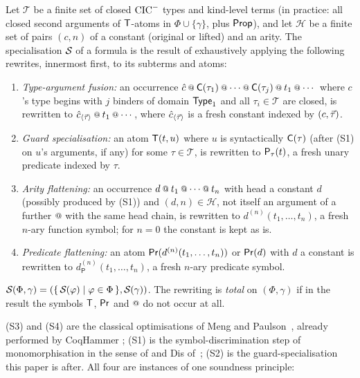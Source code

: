 \begin{definition}
\label{def:spec}
Let $\mathcal{T}$ be a finite set of closed $\mathrm{CIC}^{-}$ types and
kind-level terms (in practice: all closed second arguments of
$\mathsf{T}$-atoms in $\Phi \cup \{\gamma\}$, plus $\mathsf{Prop}$), and let
$\mathcal{H}$ be a finite set of pairs $(c, n)$ of a constant
(original or lifted) and an arity.  The specialisation
$\mathcal{S}_{}$ of a formula is the result of exhaustively applying the
following rewrites, innermost first, to its subterms and atoms:
\begin{enumerate}[label=(S\arabic*),leftmargin=3em]
\item \emph{Type-argument fusion:} an occurrence $\hat{c} \app
  \trCn{\tau_1} \app \cdots \app \trCn{\tau_j} \app t_1 \app \cdots$
  where $c$'s type begins with $j$ binders of domain $\mathsf{Type}_1$ and
  all $\tau_i \in \mathcal{T}$ are closed, is rewritten to
  $\hat{c}_{\langle\tup{\tau}\rangle} \app t_1 \app \cdots$, where
  $\hat{c}_{\langle\vec{\tau}\rangle}$ is a fresh constant indexed
  by $(c, \vec{\tau})$.
\item \emph{Guard specialisation:} an atom $\mathsf{T}(t, u)$ where
  $u$ is syntactically $\mathsf{C}(\tau)$ (after (S1) on $u$'s
  arguments, if any) for some $\tau \in \mathcal{T}$, is rewritten
  to $\mathsf{P}_{\tau}(t)$, a fresh unary predicate indexed by $\tau$.
\item \emph{Arity flattening:} an occurrence $d \app t_1 \app \cdots
  \app t_n$ with head a constant $d$ (possibly produced by (S1)) and
  $(d, n) \in \mathcal{H}$, not itself an argument of a further
  $\app$ with the same head chain, is rewritten to $d^{(n)}(t_1,
  \ldots, t_n)$, a fresh $n$-ary function symbol; for $n = 0$ the
  constant is kept as is.
\item \emph{Predicate flattening:} an atom $\mathsf{Pr}(d^{(n)}(t_1, \ldots,
  t_n))$ or $\mathsf{Pr}(d)$ with $d$ a constant is rewritten to
  $d_{\mathsf{P}}^{(n)}(t_1, \ldots, t_n)$, a fresh $n$-ary
  predicate symbol.
\end{enumerate}
$\mathcal{S}_{}(\Phi, \gamma) = (\{\,\mathcal{S}_{}(\varphi) \mid \varphi \in
\Phi\,\}, \mathcal{S}_{}(\gamma))$.  The rewriting is \emph{total} on
$(\Phi, \gamma)$ if in the result the symbols $\mathsf{T}$, $\mathsf{Pr}$ and
$\app$ do not occur at all.
\end{definition}

(S3) and (S4) are the classical optimisations of Meng and
Paulson~\cite{MengPaulson2008}, already performed by CoqHammer
\cite[\S5.5]{CzajkaKaliszyk2018}; (S1) is the symbol-discrimination
step of monomorphisation in the sense of
\cite[\S5.6]{Blanchette2016} and \textsf{Dis}
of~\cite{BobotPaskevich2011}; (S2) is the guard-specialisation this
paper is after.  All four are instances of one soundness principle:


